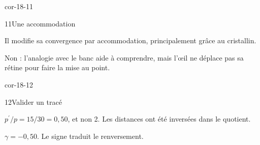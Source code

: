 \begin{blocLivre}{cor-18-11}\begin{corrige}{11}{Une accommodation}
\begin{questions}
\item Il modifie sa convergence par accommodation, principalement grâce au cristallin.
\item Non : l’analogie avec le banc aide à comprendre, mais l’œil ne déplace pas sa rétine pour faire la mise au point.
\end{questions}
\end{corrige}\end{blocLivre}
\begin{blocLivre}{cor-18-12}\begin{corrige}{12}{Valider un tracé}
\begin{questions}
\item $p^{\prime}/p=15/30=0,50$, et non 2. Les distances ont été inversées dans le quotient.
\item $\gamma=-0,50$. Le signe traduit le renversement.
\end{questions}
\end{corrige}\end{blocLivre}

